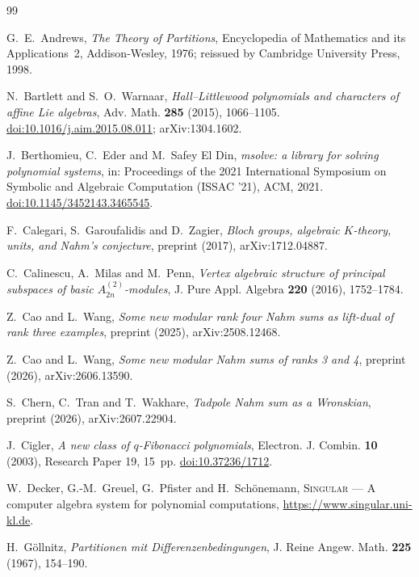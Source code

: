\begin{thebibliography}{99}

G.~E.~Andrews, \emph{The Theory of Partitions}, Encyclopedia of Mathematics and its Applications~2, Addison-Wesley, 1976; reissued by Cambridge University Press, 1998.

N.~Bartlett and S.~O.~Warnaar, \emph{Hall--Littlewood polynomials and characters of affine Lie algebras}, Adv. Math. \textbf{285} (2015), 1066--1105. \href{https://doi.org/10.1016/j.aim.2015.08.011}{doi:10.1016/j.aim.2015.08.011}; arXiv:1304.1602.

J.~Berthomieu, C.~Eder and M.~Safey El Din, \emph{msolve: a library for solving polynomial systems}, in: Proceedings of the 2021 International Symposium on Symbolic and Algebraic Computation (ISSAC '21), ACM, 2021. \href{https://doi.org/10.1145/3452143.3465545}{doi:10.1145/3452143.3465545}.

F.~Calegari, S.~Garoufalidis and D.~Zagier, \emph{Bloch groups, algebraic $K$-theory, units, and Nahm's conjecture}, preprint (2017), arXiv:1712.04887.

C.~Calinescu, A.~Milas and M.~Penn, \emph{Vertex algebraic structure of principal subspaces of basic $A_{2n}^{(2)}$-modules}, J. Pure Appl. Algebra \textbf{220} (2016), 1752--1784.

Z.~Cao and L.~Wang, \emph{Some new modular rank four Nahm sums as lift-dual of rank three examples}, preprint (2025), arXiv:2508.12468.

Z.~Cao and L.~Wang, \emph{Some new modular Nahm sums of ranks 3 and 4}, preprint (2026), arXiv:2606.13590.

S.~Chern, C.~Tran and T.~Wakhare, \emph{Tadpole Nahm sum as a Wronskian}, preprint (2026), arXiv:2607.22904.

J.~Cigler, \emph{A new class of $q$-Fibonacci polynomials}, Electron. J. Combin. \textbf{10} (2003), Research Paper 19, 15~pp. \href{https://doi.org/10.37236/1712}{doi:10.37236/1712}.

W.~Decker, G.-M.~Greuel, G.~Pfister and H.~Sch\"onemann, \textsc{Singular} --- A computer algebra system for polynomial computations, \url{https://www.singular.uni-kl.de}.

H.~G\"ollnitz, \emph{Partitionen mit Differenzenbedingungen}, J. Reine Angew. Math. \textbf{225} (1967), 154--190.


\end{thebibliography}
